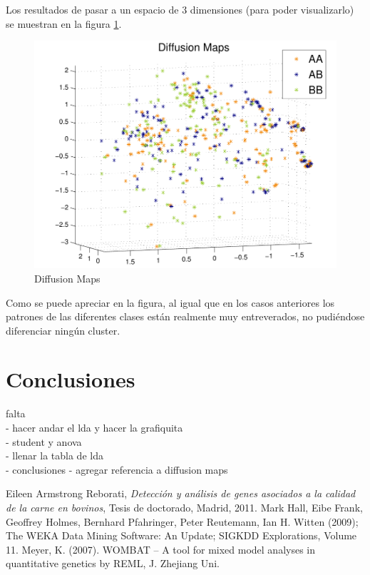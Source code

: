 \documentclass[12pt,a4paper,titlepage]{report}
\begin{document}
Los resultados de pasar a un espacio de 3 dimensiones (para poder visualizarlo) se muestran en la figura \ref{fig:dm}.
\begin{figure}[H]
	\centering 
	\includegraphics[width=.8\textwidth]{./pics/dm.pdf}
	\caption{Diffusion Maps}
	\label{fig:dm}
\end{figure}

Como se puede apreciar en la figura, al igual que en los casos anteriores los patrones de las diferentes clases están realmente muy entreverados, no pudiéndose diferenciar ningún cluster.


\chapter{Conclusiones}
falta\\
- hacer andar el lda y hacer la grafiquita\\
- student y anova\\
- llenar la tabla de lda\\
- conclusiones
- agregar referencia a diffusion maps





\begin{thebibliography}{99}
\begin{small}

Eileen Armstrong Reborati, \emph{Detección y análisis de genes asociados a la calidad de la carne en bovinos}, Tesis de doctorado, Madrid, 2011.
Mark Hall, Eibe Frank, Geoffrey Holmes, Bernhard Pfahringer, Peter Reutemann, Ian H. Witten (2009); The WEKA Data Mining Software: An Update; SIGKDD Explorations, Volume 11.
Meyer, K. (2007). WOMBAT – A tool for mixed model analyses in quantitative genetics by REML, J. Zhejiang Uni.

\end{small}
\end{thebibliography}
\end{document}
